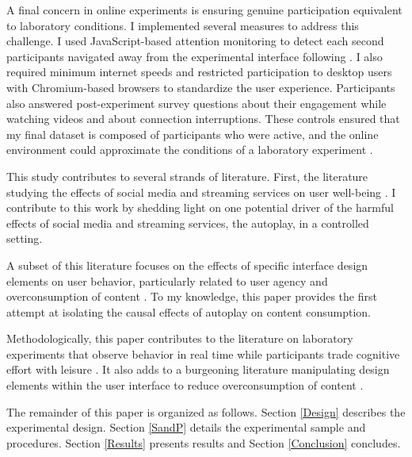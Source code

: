 \documentclass[11pt,a4paper,oneside]{article}
\begin{document}
A final concern in online experiments is ensuring genuine participation equivalent to laboratory conditions. I implemented several measures to address this challenge. I used JavaScript-based attention monitoring to detect each second participants navigated away from the experimental interface following \citep{purohit2023starving}. I also required minimum internet speeds and restricted participation to desktop users with Chromium-based browsers to standardize the user experience. Participants also answered post-experiment survey questions about their engagement while watching videos and about connection interruptions. These controls ensured that my final dataset is composed of participants who were active, and the online environment could approximate the conditions of a laboratory experiment \citep{arechar2018conducting}.

This study contributes to several strands of literature. First, the literature studying the effects of social media and streaming services on user well-being \citep{nyhan2023like,allcott2022digital,allcott2020welfare, collis2022po, groshek2018p9icsms, walton-pattison2018jhp, braghieri2022aer,bursztyn2023,beknazar2025toxic,purohit2023starving,bao2025just}. I contribute to this work by shedding light on one potential driver of the harmful effects of social media and streaming services, the autoplay, in a controlled setting.

A subset of this literature focuses on the effects of specific interface design elements on user behavior, particularly related to user agency and overconsumption of content \citep{lukoff2021design,bongard2021definitely,schaffner2025pahi,schaffner2023pahia, mathur2021p2cchfcs, lyngs2019p2cchfcs, lyngs2020p2cchfcs, silverman2024, lupianez-villanueva2022, chen2025,hoong2021eer}. To my knowledge, this paper provides the first attempt at isolating the causal effects of autoplay on content consumption.

Methodologically, this paper contributes to the literature on laboratory experiments that observe behavior in real time while participants trade cognitive effort with leisure \citep{kool2014labor,bhatia2021,ek2023too,bonein2015ee,houser2018gaeb}. It also adds to a burgeoning literature manipulating design elements within the user interface to reduce overconsumption of content \citep{hiniker2018coco,lyngs2020p2cchfcs,purohit2023starving,schaffner2025pahi}.

The remainder of this paper is organized as follows. Section \ref{Design} describes the experimental design. Section \ref{SandP} details the experimental sample and procedures. Section \ref{Results} presents results and Section \ref{Conclusion} concludes.
\end{document}
